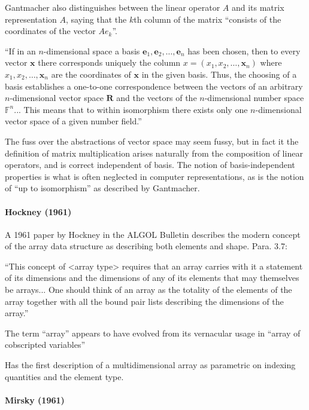 Gantmacher also distinguishes \cite[pp. 54-56]{Gantmacher1960} between the linear operator $A$ and its matrix representation $A$, saying that the $k$th column of the matrix ``consists of the coordinates of the vector $Ae_k$''.

``If in an $n$-dimensional space a basis $\mathbf e_1, \mathbf e_2, \dots, \mathbf e_n$ has been chosen, then to every vector $\mathbf x$ there corresponds uniquely the column $x = (x_1, x_2, \dots, \mathbf x_n)$ where $x_1, x_2, \dots, \mathbf x_n$ are the coordinates of $\mathbf x$ in the given basis. Thus, the choosing of a basis establishes a one-to-one correspondence between the vectors of an arbitrary $n$-dimensional vector space $\mathbf R$ and the vectors of the $n$-dimensional number space $\mathbb F^n$... This means that to within isomorphism there exists only one $n$-dimensional vector space of a given number field.''

The fuss over the abstractions of vector space may seem fussy, but in fact it the definition of matrix multiplication arises naturally from the composition of linear operators, and is correct independent of basis. The notion of basis-independent properties is what is often neglected in computer representations, as is the notion of ``up to isomorphism'' as described by Gantmacher.



\paragraph{Hockney (1961)~\cite{Hockney1961}}

A 1961 paper by Hockney in the ALGOL Bulletin
describes the modern concept of the array data structure as describing
both elements and shape. Para. 3.7:

``This concept of <array type> requires that an array carries with it a
statement of its dimensions and the dimensions of any of its elements
that may themselves be arrays... One should think of an array as the
totality of the elements of the array together with all the bound pair
lists describing the dimensions of the array.''

The term ``array'' appears to have evolved from its vernacular usage in ``array of cobscripted variables''

Has the first description of a multidimensional array as parametric on indexing quantities and the element type.


\paragraph{Mirsky (1961)~\cite{Mirsky1961}}

